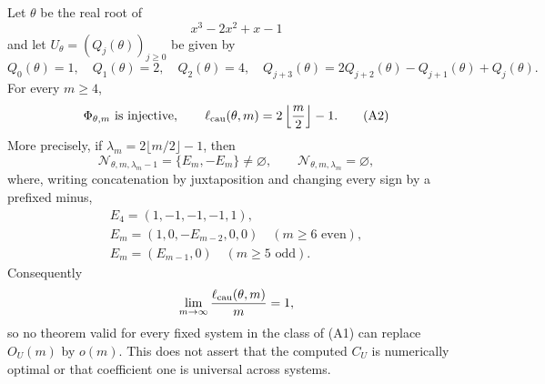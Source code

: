 \begin{theorem}
Let $\theta$ be the real root of
\[
x^3-2x^2+x-1
\]
and let $U_\theta=(Q_j(\theta))_{j\ge0}$ be given by
\begin{equation}
Q_0(\theta)=1,\quad Q_1(\theta)=2,\quad Q_2(\theta)=4,
\quad Q_{j+3}(\theta)=2Q_{j+2}(\theta)-Q_{j+1}(\theta)+Q_j(\theta).
\label{eq:theta-count-recurrence}
\end{equation}
For every $m\ge4$,
\begin{equation*}
\Phi_{\theta,m}\text{ is injective},\qquad
\ell_{\rm cau}(\theta,m)=2\left\lfloor\frac m2\right\rfloor-1.
\tag{A2}\label{eq:pisot-linear-A2}
\end{equation*}
More precisely, if
$\lambda_m=2\lfloor m/2\rfloor-1$, then
\begin{equation*}
\mathcal N_{\theta,m,\lambda_m-1}=\{E_m,-E_m\}\ne\varnothing,
\qquad
\mathcal N_{\theta,m,\lambda_m}=\varnothing,
\tag{A3}\label{eq:pisot-linear-A3}
\end{equation*}
where, writing concatenation by juxtaposition and changing every sign by a
prefixed minus,
\begin{equation}
\begin{gathered}
E_4=(1,-1,-1,-1,1),\\
E_m=(1,0,-E_{m-2},0,0)\quad(m\ge6\text{ even}),\\
E_m=(E_{m-1},0)\quad(m\ge5\text{ odd}).
\end{gathered}
\label{eq:theta-terminal-word}
\end{equation}
Consequently
\[
\lim_{m\to\infty}\frac{\ell_{\rm cau}(\theta,m)}m=1,
\]
so no theorem valid for every fixed system in the class of \textup{(A1)} can
replace $O_U(m)$ by $o(m)$.  This does not assert that the computed $C_U$ is
numerically optimal or that coefficient one is universal across systems.
\end{theorem}

